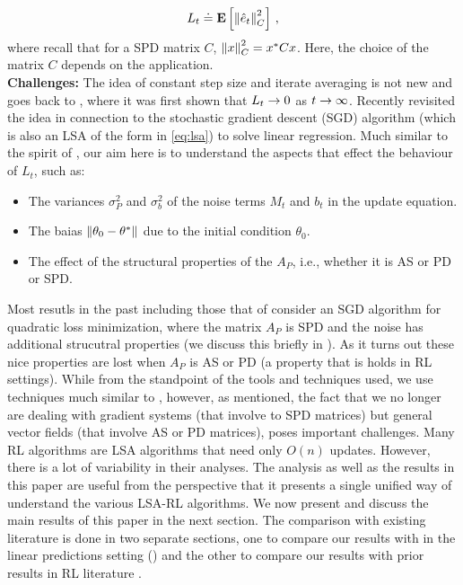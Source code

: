 \begin{align}\label{eq:exploss}
L_t \doteq \mathbf{E}\left[ \left\| \hat{e}_t\right\|_{C}^2 \right]\,,
\end{align}
where recall that for a SPD matrix $C$, $\left\| x\right\|_C^2 = x^* C x$. Here, the choice of the matrix $C$ depends on the application.\\
\textbf{Challenges:}
The idea of constant step size and iterate averaging is not new and goes back to \cite{}, where it was first shown that $L_t\rightarrow 0$ as $t\rightarrow\infty$. Recently \cite{bach} revisited the idea in connection to the stochastic gradient descent (SGD) algorithm (which is also an LSA of the form in \eqref{eq:lsa}) to solve linear regression. Much similar to the spirit of \cite{bach}, our aim here is to understand the aspects that effect the behaviour of $L_t$, such as:
\begin{itemize}
\item The variances $\sigma_P^2$ and $\sigma_b^2$ of the noise terms $M_t$ and $b_t$ in the update equation.
\item The baias $\left\| \theta_0-\theta^*\right\|$ due to the initial condition $\theta_0$.
\item The effect of the structural properties of the $A_P$, i.e., whether it is AS or PD or SPD.
\end{itemize}
Most resutls in the past including those that of \cite{bach} consider an SGD algorithm for quadratic loss minimization, where the matrix $A_P$ is SPD and the noise has additional strucutral properties (we discuss this briefly in ). As it turns out these nice properties are lost when $A_P$ is AS or PD (a property that is holds in RL settings). While from the standpoint of the tools and techniques used, we use techniques much similar to \cite{bach}, however, as mentioned, the fact that we no longer are dealing with gradient systems (that involve to SPD matrices) but general vector fields (that involve AS or PD matrices), poses important challenges.
Many RL algorithms \cite{} are LSA algorithms that need only $O(n)$ updates. However, there is a lot of variability in their analyses. The analysis as well as the results in this paper are useful from the perspective that it presents a single unified way of understand the various LSA-RL algorithms. We now present and discuss the main results of this paper in the next section. The comparison with existing literature is done in two separate sections, one to compare our results with \cite{bach} in the linear predictions setting () and the other to compare our results with prior results in RL literature \cite{}.
